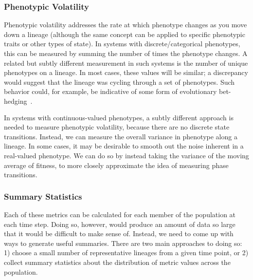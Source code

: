 \documentclass[letterpaper]{article}
\begin{document}

\subsubsection{Phenotypic Volatility}

Phenotypic volatility addresses the rate at which phenotype changes as you move down a lineage (although the same concept can be applied to specific phenotypic traits or other types of state). In systems with discrete/categorical phenotypes, this can be measured by summing the number of times the phenotype changes. A related but subtly different measurement in such systems is the number of unique phenotypes on a lineage. In most cases, these values will be similar; a discrepancy would suggest that the lineage was cycling through a set of phenotypes. Such behavior could, for example, be indicative of some form of evolutionary bet-hedging~\citep{beaumont2009experimental}.

In systems with continuous-valued phenotypes, a subtly different approach is needed to measure phenotypic volatility, because there are no discrete state transitions. Instead, we can measure the overall variance in phenotype along a lineage. In some cases, it may be desirable to smooth out the noise inherent in a real-valued phenotype. We can do so by instead taking the variance of the moving average of fitness, to more closely approximate the idea of measuring phase transitions.



\subsubsection{Summary Statistics}

Each of these metrics can be calculated for each member of the population at each time step. Doing so, however, would produce an amount of data so large that it would be difficult to make sense of. Instead, we need to come up with ways to generate useful summaries. There are two main approaches to doing so: 1) choose a small number of representative lineages from a given time point, or 2) collect summary statistics about the distribution of metric values across the population.
\end{document}
